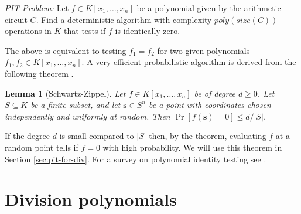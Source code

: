 \documentclass[11pt]{article}
\theoremstyle{plain}
\newtheorem{lemma}[theorem]{Lemma}
\theoremstyle{definition}
\newcommand{\abs}[1]{\left\vert#1\right\vert}
\begin{document}
\vspace*{2mm}

\textit{PIT Problem:} Let $f \in K[x_1, \dots, x_n]$ be a polynomial given by the arithmetic 
circuit $C$. Find a deterministic algorithm with complexity $poly(size(C))$ operations in $K$ that 
tests if $f$ is identically zero.

\vspace*{2mm}

The above is equivalent to testing $f_1 = f_2$ for two given polynomials $f_1, f_2 \in K[x_1, 
\dots, x_n]$. A very efficient probabilistic algorithm is derived from the following theorem 
\cite{schwartz1980,zippel1979}.
\begin{lemma}[Schwartz-Zippel]
	\label{lemma:Schwartz-Zippel}
	Let $f \in K[x_1, \dots, x_n]$ be of degree $d \ge 0$. Let $S \subseteq K$ be a finite subset, 
	and let $\mathbf{s} \in S^n$ be a point with coordinates chosen independently and uniformly at 
	random. Then $\Pr[f(\mathbf{s}) = 0] \le d / \abs{S}$.
\end{lemma}
If the degree $d$ is small compared to $\abs{S}$ then, by the theorem, evaluating $f$ at a random 
point tells if $f = 0$ with high probability. We will use this theorem in Section 
\ref{sec:pit-for-div}. For a survey on polynomial identity testing see \cite{saxena2009}.






\section{Division polynomials}
\label{sec:divpoly}
\end{document}
